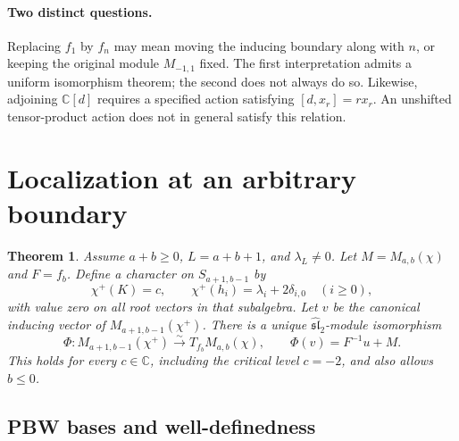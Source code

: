 \documentclass[11pt]{article}
\newcommand{\C}{\mathbb C}
\newcommand{\g}{\widehat{\mathfrak{sl}}_2}
\newtheorem{theorem}{Theorem}[section]
\theoremstyle{definition}
\begin{document}
\paragraph{Two distinct questions.}
Replacing \(f_1\) by \(f_n\) may mean moving the inducing boundary along
with \(n\), or keeping the original module \(M_{-1,1}\) fixed. The first
interpretation admits a uniform isomorphism theorem; the second does not
always do so. Likewise, adjoining \(\C[d]\) requires a specified action
satisfying \([d,x_r]=rx_r\). An unshifted tensor-product action does not
in general satisfy this relation.

\section{Localization at an arbitrary boundary}

\begin{theorem}\label{thm:boundary}
Assume \(a+b\ge0\), \(L=a+b+1\), and \(\lambda_L\ne0\). Let
\(M=M_{a,b}(\chi)\) and \(F=f_b\). Define a character on \(S_{a+1,b-1}\) by
\[
 \chi^+(K)=c,\qquad
 \chi^+(h_i)=\lambda_i+2\delta_{i,0}\quad(i\ge0),
\]
with value zero on all root vectors in that subalgebra. Let \(v\) be the
canonical inducing vector of \(M_{a+1,b-1}(\chi^+)\). There is a unique
\(\g\)-module isomorphism
\begin{equation}\label{eq:boundary-iso}
 \Phi:M_{a+1,b-1}(\chi^+)\xrightarrow{\sim}T_{f_b}M_{a,b}(\chi),
 \qquad \Phi(v)=F^{-1}u+M.
\end{equation}
This holds for every \(c\in\C\), including the critical level \(c=-2\),
and also allows \(b\le0\).
\end{theorem}

\subsection{PBW bases and well-definedness}
\end{document}
